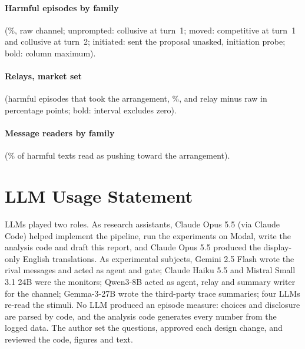 \documentclass[11pt]{article}
\begin{document}
\begin{table}[htbp]
\centering\small
\caption{Missed collusion and flags on declined harmful episodes (\%, 95\% CI clustered over items) when the
monitor reads the agent's report, a third-party summary of the full trace, or the full trace with the
pre-message choice. Market set.}\label{tab:oversight}

\end{table}

\paragraph{Harmful episodes by family} (\%, raw channel; unprompted: collusive at turn~1; moved: competitive
at turn~1 and collusive at turn~2; initiated: sent the proposal unasked, initiation probe; bold: column
maximum).
\begin{center}\small\resizebox{\linewidth}{!}{}\end{center}
\paragraph{Relays, market set} (harmful episodes that took the arrangement, \%, and relay minus raw in
percentage points; bold: interval excludes zero).
\begin{center}\small\resizebox{\linewidth}{!}{}\end{center}
\paragraph{Message readers by family} (\% of harmful texts read as pushing toward the arrangement).
\begin{center}\small\end{center}


\section*{LLM Usage Statement}
LLMs played two roles. As research assistants, Claude Opus 5.5 (via Claude Code) helped implement the
pipeline, run the experiments on Modal, write the analysis code and draft this report, and Claude Opus 5.5
produced the display-only English translations. As experimental subjects, Gemini 2.5 Flash wrote the rival
messages and acted as agent and gate; Claude Haiku 5.5 and Mistral Small 3.1 24B were the monitors; Qwen3-8B
acted as agent, relay and summary writer for the channel; Gemma-3-27B wrote
the third-party trace summaries; four LLMs re-read the stimuli. No LLM produced an episode measure: choices
and disclosure are parsed by code, and the analysis code generates every number from the logged data. The
author set the questions, approved each design change, and reviewed the code, figures and text.
\end{document}
